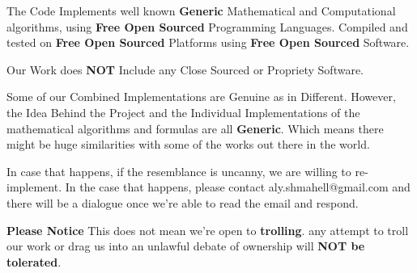 \documentclass{slides}
\begin{document}
 \begin{center}
   \begin{normalsize}
  The Code Implements well known \textbf{Generic} Mathematical and Computational algorithms, using \textbf{Free Open Sourced} Programming Languages. Compiled and tested on \textbf{Free Open Sourced} Platforms using \textbf{Free Open Sourced} Software.
    \end{normalsize}
     \end{center} 
     \begin{center}
        \begin{normalsize}
  Our Work does \textbf{NOT} Include any Close Sourced or Propriety Software.
  \end{normalsize}
     \end{center} 
     \begin{center}
             \begin{normalsize}
             
  \newpage
  Some of our Combined Implementations are Genuine as in Different. However, the Idea Behind the Project and the Individual Implementations of the mathematical algorithms and formulas are all \textbf{Generic}. Which means there might be huge similarities with some of the works out there in the world.
    \end{normalsize}
     \end{center} 
     \begin{center}
    \begin{normalsize}

  In case that happens, if the resemblance is uncanny, we are willing to re-implement.
  In the case that happens, please contact aly.shmahell@gmail.com and there will be a dialogue once we're able to read the email and respond.
  \end{normalsize}
     \end{center} 
     \begin{center}
         \begin{normalsize}
  \textbf{Please Notice} This does not mean we're open to \textbf{trolling}. any attempt to troll our work or drag us into an unlawful debate of ownership will \textbf{NOT be tolerated}.
  
  \end{normalsize}
   \end{center} 
\end{document}
